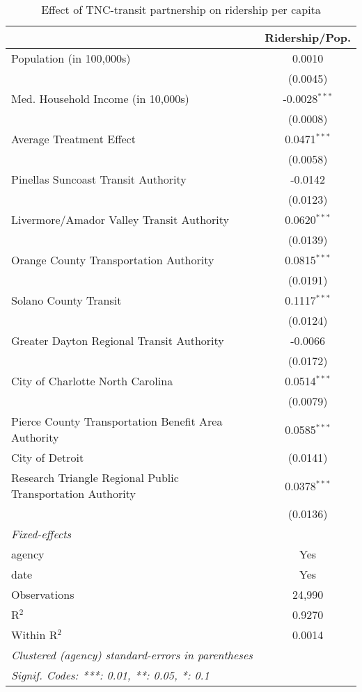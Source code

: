 \documentclass [12pt]{report}
\begin{document}
\begin{table}[H]
\centering 
\tiny
\caption{Effect of TNC-transit partnership on ridership per capita}
\begin{tabular}{lc}
   \tabularnewline \midrule
   \midrule
   & Ridership/Pop. \\   
   \midrule
   Population (in 100,000s) & 0.0010 \\
   & (0.0045)\\
   \midrule
   Med. Household Income (in 10,000s) & -0.0028$^{***}$ \\
   & (0.0008)\\
   \midrule
   Average Treatment Effect & 0.0471$^{***}$\\
   & (0.0058)\\
   \midrule
   Pinellas Suncoast Transit Authority & -0.0142\\   
   & (0.0123) \\   
   \midrule
   Livermore/Amador Valley Transit Authority & 0.0620$^{***}$ \\   
   & (0.0139) \\   
   \midrule
   Orange County Transportation Authority & 0.0815$^{***}$ \\   
   & (0.0191) \\   
   \midrule
   Solano County Transit & 0.1117$^{***}$ \\   
   & (0.0124)\\   
   \midrule
   Greater Dayton Regional Transit Authority & -0.0066 \\   
   & (0.0172)\\  
   \midrule
   City of Charlotte North Carolina & 0.0514$^{***}$ \\   
   & (0.0079) \\   
   \midrule
   Pierce County Transportation Benefit Area Authority & 0.0585$^{***}$ \\   
   City of Detroit & (0.0141) \\   
   \midrule
   Research Triangle Regional Public Transportation Authority & 0.0378$^{***}$\\   
   & (0.0136) \\    
   \midrule
   \multicolumn{1}{l}{\emph{Fixed-effects}} & \\
   agency & Yes \\  
   date & Yes \\   
   \midrule
   Observations              & 24,990\\  
   R$^2$                     & 0.9270\\  
   Within R$^2$              & 0.0014\\  
   \midrule \midrule
   \multicolumn{1}{l}{\emph{Clustered (agency) standard-errors in parentheses}}\\
   \multicolumn{1}{l}{\emph{Signif. Codes: ***: 0.01, **: 0.05, *: 0.1}}\\
\end{tabular}
\end{table}
\end{document}
